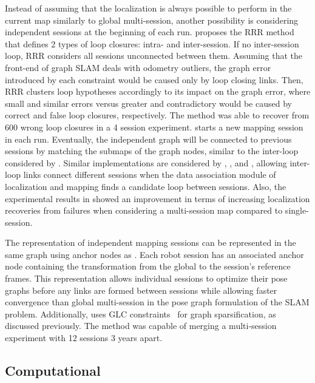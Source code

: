 Instead of assuming that the localization is always possible to perform in the current map similarly to global multi-session, another possibility is considering independent sessions at the beginning of each run.
\cite{latif-et-al:2012:6385879} proposes the RRR method that defines 2 types of loop closures: intra- and inter-session. If no inter-session loop, RRR considers all sessions unconnected between them. Assuming that the front-end of graph SLAM deals with odometry outliers, the graph error introduced by each constraint would be caused only by loop closing links. Then, RRR clusters loop hypotheses accordingly to its impact on the graph error, where small and similar errors versus greater and contradictory would be caused by correct and false loop closures, respectively. The method was able to recover from 600 wrong loop closures in a 4 session experiment.
\cite{oberländer-et-al:2013:6766479} starts a new mapping session in each run. Eventually, the independent graph will be connected to previous sessions by matching the submaps of the graph nodes, similar to the inter-loop considered by \cite{latif-et-al:2012:6385879}.
Similar implementations are considered by \cite{mühlfellner-et-al:2016:21595}, \cite{lázaro-et-al:2018:8594310}, and \cite{labbé-michaud:2019:21831}, allowing inter-loop links connect different sessions when the data association module of localization and mapping finds a candidate loop between sessions. Also, the experimental results in \cite{mühlfellner-et-al:2016:21595} showed an improvement in terms of increasing localization recoveries from failures when considering a multi-session map compared to single-session.

The representation of independent mapping sessions can be represented in the same graph using anchor nodes as \cite{ozog-et-al:2016:21582}.
Each robot session has an associated anchor node containing the transformation from the global to the session's reference frames. This representation allows individual sessions to optimize their pose graphs before any links are formed between sessions while allowing faster convergence than global multi-session in the pose graph formulation of the SLAM problem.
Additionally, \cite{ozog-et-al:2016:21582} uses GLC constraints~\parencite{carlevaris-bianco-et-al:2014:2347571} for graph sparsification, as discussed previously.
The method was capable of merging a multi-session experiment with 12 sessions 3 years apart.





\subsection{Computational}
\label{sec:discussion:computational}

